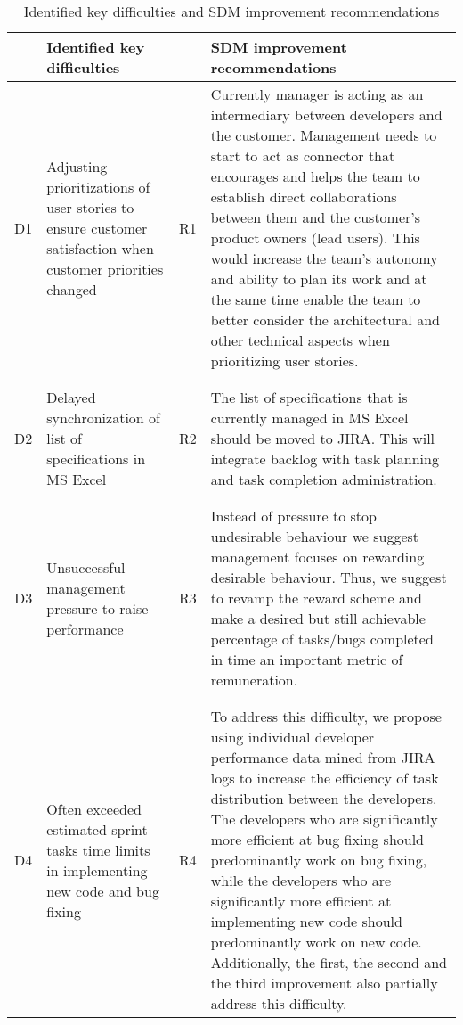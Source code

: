 \begin{table}[]
\centering
\caption{Identified key difficulties and SDM improvement recommendations }
\label{tab:key-difficulties}
\begin{tabular}{@{}m{1cm}m{3cm}m{1cm}m{5cm}@{}}
\toprule
 &
  Identified key difficulties &
   &
  SDM improvement recommendations \\ \midrule
D1 &
  Adjusting prioritizations of user stories to ensure customer satisfaction when customer priorities changed &
  R1 &
  Currently manager is acting as an intermediary 			between developers and the customer. Management needs to start to 			act as connector that encourages and helps the team to establish 			direct collaborations between them and the customer’s product 			owners (lead users). This would increase the team’s autonomy and 			ability to plan its work and at the same time enable the team to 			better consider the architectural and other technical aspects when 			prioritizing user stories. \\ \\ \hdashline \\
D2 &
  Delayed synchronization of list of specifications in MS Excel &
  R2 &
  The list of specifications that is currently 			managed in MS Excel should be moved to JIRA. This will integrate 			backlog with task planning and task completion administration. \\ \\ \hdashline \\
D3 &
  Unsuccessful management pressure to raise performance &
  R3 &
  Instead of pressure to stop undesirable behaviour we suggest management focuses on rewarding desirable 			behaviour. Thus, we suggest to revamp the reward scheme and make a 			desired but still achievable percentage of tasks/bugs completed in 			time an important metric of remuneration. \\ \\ \hdashline \\
D4 &
  Often exceeded estimated sprint tasks time limits in implementing new code and bug fixing &
  R4 &
  To address this difficulty, we propose using individual developer performance data mined from JIRA logs to 			increase the efficiency of task distribution between the 			developers. The developers who are significantly more efficient at 			bug fixing should predominantly work on bug fixing, while the 			developers who are significantly more efficient at implementing 			new code should predominantly work on new code. Additionally, the 			first, the second and the third improvement also partially address 			this difficulty. \\ \bottomrule
\end{tabular}%
\end{table}